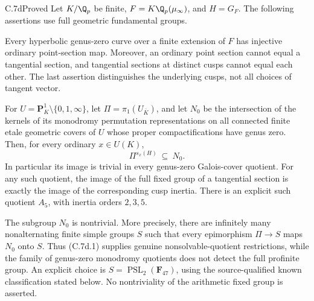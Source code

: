 \begin{claim}{C.7d}{Proved}
Let $K/\Q_p$ be finite, $F=K\Q_p(\mu_\infty)$, and
$H=G_F$. The following assertions use full geometric fundamental groups.

Every hyperbolic genus-zero curve over a finite extension of $F$ has
injective ordinary point-section map. Moreover, an ordinary point
section cannot equal a tangential section, and tangential sections
at distinct cusps cannot equal each other. The last assertion
distinguishes the underlying cusps, not all choices of tangent vector.

For $U=\mathbf P^1_K\setminus\{0,1,\infty\}$, let
$\Pi=\pi_1(U_{\bar K})$, and let $N_0$ be the intersection of the kernels
of its monodromy permutation representations on all connected finite
etale geometric covers of $U$ whose proper compactifications have genus
zero. Then, for every ordinary $x\in U(K)$,
\[
                 \Pi^{s_x(H)}\ \subseteq\ N_0.                 \tag{C.7d.1}
\]
In particular its image is trivial in every genus-zero Galois-cover
quotient. For any such quotient, the image of the full fixed group
of a tangential section is exactly the image of the corresponding
cusp inertia. There is an explicit such quotient $A_5$, with inertia
orders $2,3,5$.

The subgroup $N_0$ is nontrivial. More precisely, there are infinitely
many nonalternating finite simple groups $S$ such that every epimorphism
$\Pi\to S$ maps $N_0$ onto $S$. Thus (C.7d.1) supplies genuine
nonsolvable-quotient restrictions, while the family of genus-zero
monodromy quotients does not detect the full profinite group.
An explicit choice is $S=\operatorname{PSL}_2(\mathbf F_{47})$,
using the source-qualified known classification stated below.
No nontriviality of the arithmetic fixed group is asserted.
\end{claim}
